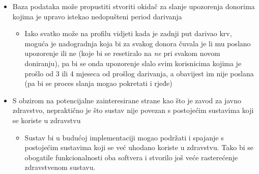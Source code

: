 {\begin{itemize}
                \item Baza podataka može propustiti stvoriti okidač za slanje upozorenja donorima kojima je upravo istekao nedopušteni period darivanja
                \begin{itemize}
                    \item Iako svatko može na profilu vidjeti kada je zadnji put darivao krv, moguća je nadogradnja koja bi za svakog donora čuvala je li mu poslano upozorenje ili ne (koje bi se resetiralo na \textit{ne} pri svakom novom doniranju), pa bi se onda upozorenje slalo svim korisnicima kojima je prošlo  od 3 ili 4 mjeseca od prošlog darivanja, a obavijest im nije poslana (pa bi se proces slanja mogao pokretati i rjeđe)
                \end{itemize}
                
                \item S obzirom na potencijalne zainteresirane strane kao što je zavod za javno zdravstvo, nepraktično je što sustav nije povezan s postojećim sustavima koji se koriste u zdravstvu
                \begin{itemize}
                    \item Sustav bi u budućoj implementaciji mogao podržati i spajanje s postojećim sustavima koji se već uhodano koriste u zdravstvu. Tako bi se obogatile funkcionalnosti oba softvera i stvorilo još veće rasterećenje zdravstvenom sustavu.
                \end{itemize}
                
            \end{itemize}
            }
            
